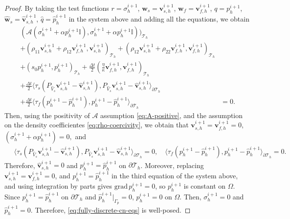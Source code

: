\documentclass[10pt,a4paper]{amsart}
\newcommand{\Ael}{\mathcal{A}} %
\newcommand{\Id}{\mathbb{I}} %
\newcommand{\Thprod}[2]{( #1, #2 )_{\mathcal{T}_h}}
\newcommand{\grad}{\mathrm{grad}\,}
\newcommand{\pThprod}[2]{\langle #1, #2 \rangle_{\partial \mathcal{T}_{h}}}
\newcommand{\vect}[1]{\mathbf{#1}}
\begin{document}
\begin{proof}
	By taking the test functions $r = \sigma_h^{i+1}$, $\vect{w}_{s} = \vect{v}_{s,h}^{i+1}$, $\vect{w}_{f} = \vect{v}_{f,h}^{i+1}$, $q = p_h^{i+1}$, $\widehat{\vect{w}}_{s} = \widehat{\vect{v}}_{s,h}^{i+1}$, $\widehat{q}=\widehat{p}_{h}^{i+1}$ in the system above and adding all the equations, we obtain
	\begin{align*}
		\Thprod{\Ael({\sigma}_{h}^{i+1} + \alpha {p}_{h}^{i+1} \Id)}{{\sigma}_{h}^{i+1} + \alpha {p}_{h}^{i+1} \Id)}
        \\
		+ \Thprod{\rho_{11}\vect{v}_{s,h}^{i+1} +\rho_{12}\vect{v}_{f,h}^{i+1}}{\vect{v}_{s,h}^{i+1}} +\Thprod{\rho_{12}\vect{v}_{s,h}^{i+1}+\rho_{22}\vect{v}_{f,h}^{i+1}}{\vect{v}_{f,h}^{i+1}} 
		\\
		+ \Thprod{s_{0}p_h^{i+1}}{p_h^{i+1}} + \frac{\Delta t}{2} \Thprod{\frac{\eta}{\kappa} \vect{v}_{f,h}^{i+1}}{\vect{v}_{f,h}^{i+1}} 
		\\
		+ \frac{\Delta t}{2}  \pThprod{\tau_{s} ({P_{\widehat{V}_s}} \vect{v}_{s,h}^{i+1} - \widehat{\vect{v}}_{s,h}^{i+1})}{P_{\widehat{V}_s}\vect{v}_{s,h}^{i+1}-\widehat{\vect{v}}_{s,h}^{i+1}}
		\\
		+ \frac{\Delta t}{2} \pThprod{\tau_{f} (p_{h}^{i+1} - \widehat{p}_{h}^{i+1})}{p_h^{i+1}-\widehat{p}_h^{i+1}}&=0 . 
	\end{align*}
	Then, using the positivity of $\Ael$ assumption \eqref{eq:A-positive},  and the assumption on the density coefficientes \eqref{eq:rho-coercivity}, we obtain that 
	$\vect{v}_{s,h}^{i+1}= \vect{v}_{f,h}^{i+1} =   0$, $ (\sigma_h^{i+1} + \alpha p_h^{i+1}) = 0, $ and 
	\begin{align*}
		\quad \pThprod{\tau_{s} ({P_{\widehat{V}_s}} \vect{v}_{s,h}^{i+1} - \widehat{\vect{v}}_{s,h}^{i+1})}{P_{\widehat{V}_s}\vect{v}_{s,h}^{i+1}-\widehat{\vect{v}}_{s,h}^{i+1}} = 0, \quad 
		\pThprod{\tau_{f} (p_{h}^{i+1} - \widehat{p}_{h}^{i+1})}{p_h^{i+1}-\widehat{p}_h^{i+1}} = 0. 
	\end{align*}
	Therefore, $\widehat{\vect{v}}_{s,h}^{i+1} = 0$ and $p_h^{i+1} = \widehat{p}_h^{i+1}$ on $\partial \mathcal{T}_h$. Moreover, replacing $\vect{v}_{s,h}^{i+1}= \vect{v}_{f,h}^{i+1} =   0$, and $p_h^{i+1} = \widehat{p}_h^{i+1}$ in the third equation of the system above, and using integration by parts gives $\grad p_h^{i+1} = 0$, so $p_h^{i+1}$ is constant on $\Omega$. Since $p_h^{i+1} = \widehat{p}_h^{i+1}$ on $\partial \mathcal{T}_h$ and $\widehat{p}_h^{i+1}|_{\Gamma_p} = 0$, $p_h^{i+1} = 0$ on $\Omega$. Then, $\sigma_h^{i+1} = 0$ and $\widehat{p}_h^{i+1} =0$. Therefore, \eqref{eq:fully-discrete-cn-eqs} is well-posed.
\end{proof}
\end{document}
